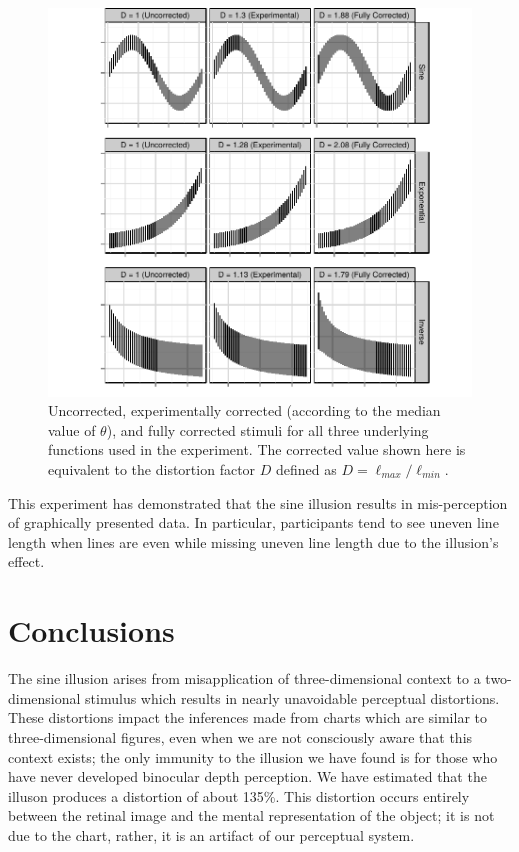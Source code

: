 \documentclass[11pt]{isuthesis}\usepackage[]{graphicx}\usepackage[]{color}
\begin{document}
\begin{figure}[tp]\centering
\includegraphics[width=6in,trim=.25in 0in .25in 0in]{fig-allOptimalWeights} 
\caption{Uncorrected, experimentally corrected (according to the median value of $\theta$), and fully corrected stimuli for all three underlying functions used in the experiment. The corrected value shown here is equivalent to the distortion factor $D$ defined as $D=\ell_{max}/\ell_{min}$.}\label{fig:allCorrectionOptimal}
\end{figure}
This experiment has demonstrated that the sine illusion results in mis-perception of graphically presented data. In particular, participants tend to see uneven line length when lines are even while missing uneven line length due to the illusion's effect. 

\section{Conclusions}
The sine illusion arises from misapplication of three-dimensional context to a two-dimensional stimulus which results in nearly unavoidable perceptual distortions. These distortions impact the inferences made from charts which are similar to three-dimensional figures, even when we are not consciously aware that this context exists; the only immunity to the illusion we have found is for those who have never developed binocular depth perception. We have estimated that the illuson produces a distortion of about 135\%. This distortion occurs entirely between the retinal image and the mental representation of the object; it is not due to the chart, rather, it is an artifact of our perceptual system. 
\end{document}
